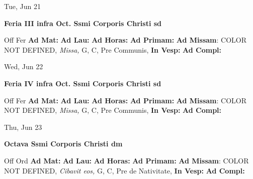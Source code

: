 \documentclass[10pt]{book}
\begin{document}
\begin{center}
\begin{minipage}{3.5in}
\vspace{2em}
\begin{center}Tue, Jun 21
\end{center}
\textbf{ \large Feria III infra Oct. Ssmi Corporis Christi
\textnormal{\normalsize sd}}

\begin{justify}Off Fer
\textbf{Ad Mat: }
\textbf{Ad Lau: }
\textbf{Ad Horas: }
\textbf{Ad Primam: }\textbf{Ad Missam}: COLOR NOT DEFINED, \textit{Missa,} G, C, Pre Communis, 
\textbf{In Vesp: }
\textbf{Ad Compl: }
\end{justify}
\end{minipage}
\end{center}

\begin{center}
\begin{minipage}{3.5in}
\vspace{2em}
\begin{center}Wed, Jun 22
\end{center}
\textbf{ \large Feria IV infra Oct. Ssmi Corporis Christi
\textnormal{\normalsize sd}}

\begin{justify}Off Fer
\textbf{Ad Mat: }
\textbf{Ad Lau: }
\textbf{Ad Horas: }
\textbf{Ad Primam: }\textbf{Ad Missam}: COLOR NOT DEFINED, \textit{Missa,} G, C, Pre Communis, 
\textbf{In Vesp: }
\textbf{Ad Compl: }
\end{justify}
\end{minipage}
\end{center}

\begin{center}
\begin{minipage}{3.5in}
\vspace{2em}
\begin{center}Thu, Jun 23
\end{center}
\textbf{ \large Octava Ssmi Corporis Christi
\textnormal{\normalsize dm}}

\begin{justify}Off Ord
\textbf{Ad Mat: }
\textbf{Ad Lau: }
\textbf{Ad Horas: }
\textbf{Ad Primam: }\textbf{Ad Missam}: COLOR NOT DEFINED, \textit{Cibavit eos,} G, C, Pre de Nativitate, 
\textbf{In Vesp: }
\textbf{Ad Compl: }
\end{justify}
\end{minipage}
\end{center}
\end{document}
